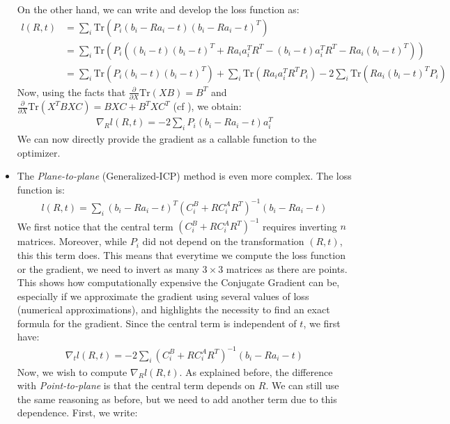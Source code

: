 \documentclass[11pt,letterpaper,leqno]{article}
\begin{document}
\begin{itemize}
    On the other hand, we can write and develop the loss function as:
    \begin{align*}
        l(R,t) &= \sum_i \text{Tr}(P_i (b_i - R a_i - t) (b_i - R a_i - t)^T) \\
        &= \sum_i \text{Tr}\left(P_i \left( (b_i - t)(b_i - t)^T + R a_i a_i^T R^T - (b_i-t)a_i^T R^T - R a_i(b_i-t)^T\right) \right)\\
        &= \sum_i \text{Tr}\left(P_i (b_i - t)(b_i - t)^T \right) +\sum_i \text{Tr}\left(R a_i a_i^T R^T P_i\right) - 2\sum_i \text{Tr}\left(R a_i(b_i-t)^T P_i\right)
    \end{align*}
    Now, using the facts that $\frac{\partial}{\partial X} \text{Tr}(XB) = B^T$ and $\frac{\partial}{\partial X} \text{Tr}(X^TBXC) = BXC + B^TXC^T$ (cf \cite{cookbook}), we obtain:
    \begin{align}
        \nabla_R l(R,t) = - 2 \sum_i P_i (b_i - R a_i -t) a_i^T \label{eq:grad_point2plane}
    \end{align}
    We can now directly provide the gradient as a callable function to the optimizer.
    \item The \textit{Plane-to-plane} (Generalized-ICP) method is even more complex. The loss function is:
    \begin{align*}
        l(R,t) = \sum_i (b_i - Ra_i - t)^T \left(C_i^B + R C_i^A R^T\right)^{-1} (b_i - Ra_i - t)
    \end{align*}
    We first notice that the central term $\left(C_i^B + R C_i^A R^T\right)^{-1}$ requires inverting $n$ matrices. Moreover, while $P_i$ did not depend on the transformation $(R,t)$, this this term does. This means that everytime we compute the loss function or the gradient, we need to invert as many $3\times 3$ matrices as there are points. This shows how computationally expensive the Conjugate Gradient can be, especially if we approximate the gradient using several values of loss (numerical approximations), and highlights the necessity to find an exact formula for the gradient. Since the central term is independent of $t$, we first have: 
    \begin{align}
        \nabla_t l(R,t) = - 2 \sum_i \left(C_i^B + R C_i^A R^T\right)^{-1} (b_i - R a_i -t)
    \end{align}
    Now, we wish to compute $\nabla_R l(R,t)$. As explained before, the difference with \textit{Point-to-plane} is that the central term depends on $R$. We can still use the same reasoning as before, but we need to add another term due to this dependence. First, we write:

\end{itemize}
\end{document}
